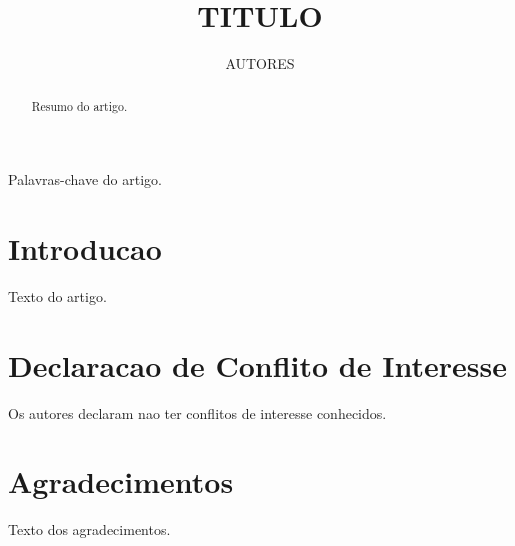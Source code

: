 \documentclass[journal]{IEEEtran}
\begin{document}
\title{{TITULO}}

\author{
{AUTORES}
}

\maketitle

\begin{abstract}
Resumo do artigo.
\end{abstract}

\begin{IEEEkeywords}
Palavras-chave do artigo.
\end{IEEEkeywords}

\section{Introducao}

Texto do artigo.

\section*{Declaracao de Conflito de Interesse}
Os autores declaram nao ter conflitos de interesse conhecidos.

\section*{Agradecimentos}
Texto dos agradecimentos.



\end{document}
